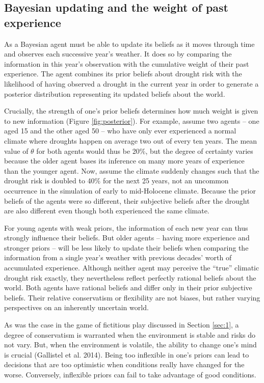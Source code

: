 \documentclass[smallextended]{svjour3}       %
\begin{document}
\hypertarget{bayesian-updating-and-the-weight-of-past-experience}{%
\subsection{Bayesian updating and the weight of past experience}\label{bayesian-updating-and-the-weight-of-past-experience}}

As a Bayesian agent must be able to update its beliefs as it moves through time and observes each successive year's weather. It does so by comparing the information in this year's observation with the cumulative weight of their past experience. The agent combines its prior beliefs about drought risk with the likelihood of having observed a drought in the current year in order to generate a posterior distribution representing its updated beliefs about the world.

Crucially, the strength of one's prior beliefs determines how much weight is given to new information (Figure \ref{fig:posterior}). For example, assume two agents -- one aged 15 and the other aged 50 -- who have only ever experienced a normal climate where droughts happen on average two out of every ten years. The mean value of \(\theta\) for both agents would thus be 20\%, but the degree of certainty varies because the older agent bases its inference on many more years of experience than the younger agent. Now, assume the climate suddenly changes such that the drought risk is doubled to 40\% for the next 25 years, not an uncommon occurrence in the simulation of early to mid-Holocene climate. Because the prior beliefs of the agents were so different, their subjective beliefs after the drought are also different even though both experienced the same climate.

For young agents with weak priors, the information of each new year can thus strongly influence their beliefs. But older agents -- having more experience and stronger priors -- will be less likely to update their beliefs when comparing the information from a single year's weather with previous decades' worth of accumulated experience. Although neither agent may perceive the ``true'' climatic drought risk exactly, they nevertheless reflect perfectly rational beliefs about the world. Both agents have rational beliefs and differ only in their prior subjective beliefs. Their relative conservatism or flexibility are not biases, but rather varying perspectives on an inherently uncertain world.

As was the case in the game of fictitious play discussed in Section \ref{sec:1}, a degree of conservatism is warranted when the environment is stable and risks do not vary. But, when the environment is volatile, the ability to change one's mind is crucial (Gallistel et al. 2014). Being too inflexible in one's priors can lead to decisions that are too optimistic when conditions really have changed for the worse. Conversely, inflexible priors can fail to take advantage of good conditions.
\end{document}
